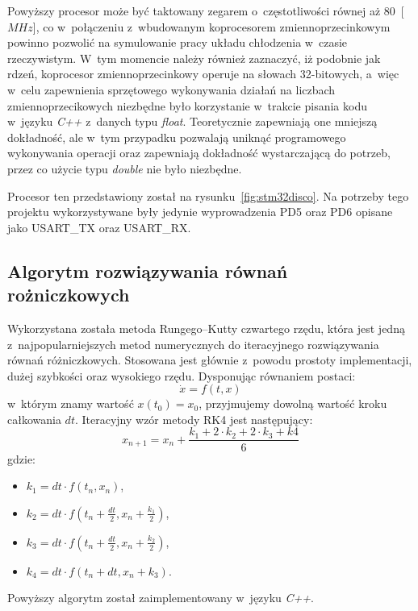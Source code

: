 Powyższy procesor może być taktowany zegarem o~częstotliwości równej aż
$80$~[$MHz$], co w~połączeniu z~wbudowanym koprocesorem zmiennoprzecinkowym
powinno pozwolić na symulowanie pracy układu chłodzenia w~czasie rzeczywistym.
W~tym momencie należy również zaznaczyć, iż podobnie jak rdzeń, koprocesor
zmiennoprzecinkowy operuje na słowach 32-bitowych, a~więc w~celu zapewnienia
sprzętowego wykonywania działań na liczbach zmiennoprzecikowych niezbędne było
korzystanie w~trakcie pisania kodu w~języku \textit{C++} z~danych typu
\textit{float}. Teoretycznie zapewniają one mniejszą dokładność, ale w~tym
przypadku pozwalają uniknąć programowego wykonywania operacji oraz zapewniają
dokładność wystarczającą do potrzeb, przez co użycie typu \textit{double} nie
było niezbędne.

Procesor ten przedstawiony został na rysunku~\ref{fig:stm32disco}. Na potrzeby
tego projektu wykorzystywane były jedynie wyprowadzenia PD5 oraz PD6 opisane
jako USART\_TX oraz USART\_RX.

\subsection{Algorytm rozwiązywania równań rożniczkowych}
\indent

Wykorzystana została metoda Rungego--Kutty czwartego rzędu, która jest jedną
z~najpopularniejszych metod numerycznych do iteracyjnego rozwiązywania równań
różniczkowych. Stosowana jest głównie z~powodu prostoty implementacji, dużej
szybkości oraz wysokiego rzędu.
Dysponując równaniem postaci:
\begin{equation*}
    \dot{x} = f\left( t, x \right)
\end{equation*}
w~którym znamy wartość $x(t_0) = x_0$, przyjmujemy dowolną wartość kroku
całkowania $dt$. Iteracyjny wzór metody RK4 jest następujący:
\begin{equation}
    x_{n+1} = x_n + \frac{k_1 + 2 \cdot k_2 + 2 \cdot k_3 + k4}{6}
    \label{equ:rk4}
\end{equation}
gdzie:
\begin{itemize}
    \item $k_1 = dt \cdot f\left( t_n, x_n \right)$,
    \item $k_2 = dt \cdot f\left( t_n + \frac{dt}{2}, x_n + \frac{k_1}{2}
    \right)$,
    \item $k_3 = dt \cdot f\left( t_n + \frac{dt}{2}, x_n + \frac{k_2}{2}
    \right)$,
    \item $k_4 = dt \cdot f\left( t_n + dt, x_n + k_3 \right)$.
\end{itemize}
Powyższy algorytm został zaimplementowany w~języku \textit{C++}.

